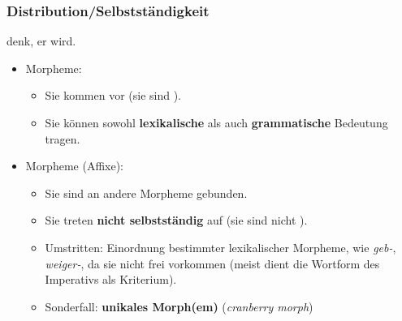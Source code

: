 \begin{frame}
\frametitle{Distribution/Selbstständigkeit}

\ea {} denk,  er    wird.
\z

\begin{itemize}

	\item {} Morpheme: 
	
	\begin{itemize}
		\item Sie kommen  vor (sie sind ).
		
		\item Sie können sowohl \textbf{lexikalische} als auch \textbf{grammatische} Bedeutung tragen.
	\end{itemize}
	
\pause
	
	\item {} Morpheme (Affixe): 
	
	\begin{itemize}
		\item Sie sind an andere Morpheme gebunden.
		
		\item Sie treten \textbf{nicht selbstständig} auf (sie sind nicht ).
		
		\item Umstritten: Einordnung bestimmter lexikalischer Morpheme, wie \emph{geb-}, \emph{weiger-}, da sie nicht frei vorkommen (meist dient die Wortform des Imperativs als Kriterium).
		
\pause

		\item Sonderfall: \textbf{unikales Morph(em)} (\emph{cranberry morph})
	
	\end{itemize}
	
	
\end{itemize}
\end{frame}


